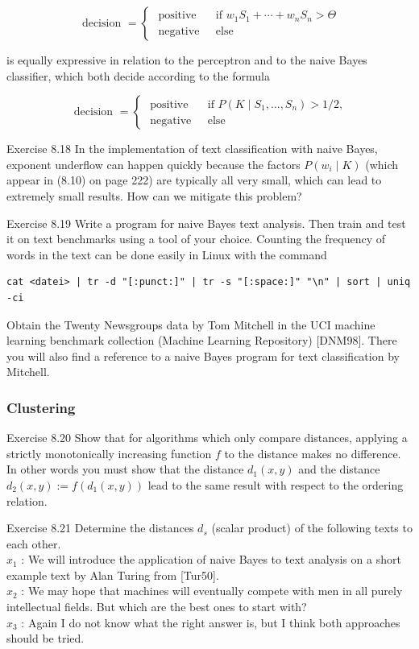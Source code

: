 \documentclass[10pt]{article}
\begin{document}
$$
\text { decision }= \begin{cases}\text { positive } & \text { if } w_{1} S_{1}+\cdots+w_{n} S_{n}>\Theta \\ \text { negative } & \text { else }\end{cases}
$$

is equally expressive in relation to the perceptron and to the naive Bayes classifier, which both decide according to the formula

$$
\text { decision }= \begin{cases}\text { positive } & \text { if } P\left(K \mid S_{1}, \ldots, S_{n}\right)>1 / 2, \\ \text { negative } & \text { else }\end{cases}
$$

Exercise 8.18 In the implementation of text classification with naive Bayes, exponent underflow can happen quickly because the factors $P\left(w_{i} \mid K\right)$ (which appear in (8.10) on page 222) are typically all very small, which can lead to extremely small results. How can we mitigate this problem?

Exercise 8.19 Write a program for naive Bayes text analysis. Then train and test it on text benchmarks using a tool of your choice. Counting the frequency of words in the text can be done easily in Linux with the command

\begin{verbatim}
cat <datei> | tr -d "[:punct:]" | tr -s "[:space:]" "\n" | sort | uniq -ci
\end{verbatim}

Obtain the Twenty Newsgroups data by Tom Mitchell in the UCI machine learning benchmark collection (Machine Learning Repository) [DNM98]. There you will also find a reference to a naive Bayes program for text classification by Mitchell.

\subsubsection*{Clustering}
Exercise 8.20 Show that for algorithms which only compare distances, applying a strictly monotonically increasing function $f$ to the distance makes no difference. In other words you must show that the distance $d_{1}(x, y)$ and the distance $d_{2}(x, y):= f\left(d_{1}(x, y)\right)$ lead to the same result with respect to the ordering relation.

Exercise 8.21 Determine the distances $d_{s}$ (scalar product) of the following texts to each other.\\
$x_{1}$ : We will introduce the application of naive Bayes to text analysis on a short example text by Alan Turing from [Tur50].\\
$x_{2}$ : We may hope that machines will eventually compete with men in all purely intellectual fields. But which are the best ones to start with?\\
$x_{3}$ : Again I do not know what the right answer is, but I think both approaches should be tried.
\end{document}
